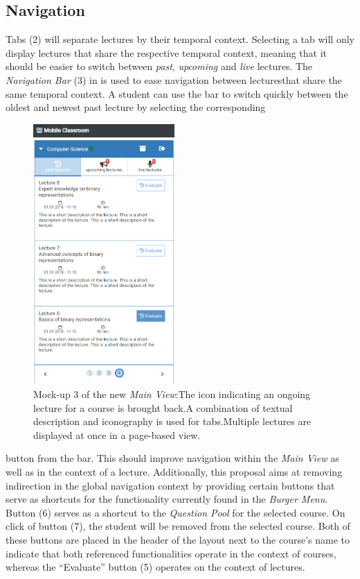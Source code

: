 \subsection{Navigation}
\label{section:con:proposals:mainview:navigation}
Tabs (2) will separate lectures by their temporal context. Selecting a tab will only display lectures that share the respective temporal context, meaning that it should be easier to switch between \emph{past}, \emph{upcoming} and \emph{live} lectures.
The \emph{Navigation Bar} (3) in  is used to ease navigation between lecturesthat share the same temporal context. A student can use the bar to switch quickly between the oldest and newest past lecture by selecting the corresponding
\begin{figure}
	\vspace*{-0.5cm}
	\begin{center}
		\includegraphics[width=0.48\textwidth]{mockups/main_view_enhancement_v3.png}
	\end{center}
	\captionsetup{format=plain}
	\caption{Mock-up 3 of the new \emph{Main View}:The icon indicating an ongoing lecture for a course is brought back.A combination of textual description and iconography is used for tabs.Multiple lectures are displayed at once in a page-based view.}
	\label{figure:mainviewenhancement3}
	\vspace*{-0.5cm}
\end{figure} button from the bar. This should improve navigation within the \emph{Main View} as well as in the context of a lecture.  Additionally, this proposal aims at removing indirection in the global navigation context by providing certain buttons that serve as shortcuts for the functionality currently found in the \emph{Burger Menu}. Button (6) serves as a shortcut to the \emph{Question Pool} for the selected course. On click of button (7), the student will be removed from the selected course. Both of these buttons are placed in the header of the layout next to the course’s name to indicate that both referenced functionalities operate in the context of courses, whereas the “Evaluate” button (5) operates on the context of lectures.
